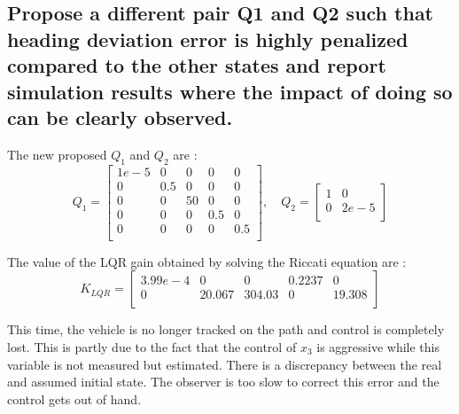 \subsection{Propose a different pair Q1 and Q2 such that heading deviation error is highly penalized compared to the other states and report simulation results where the impact of doing so can be clearly observed.}
The new proposed $Q_1$ and $Q_2$ are :
\begin{equation}
    Q_1 = 
    \left[ {\begin{array}{ccccc}
        1e-5 &0   &0   &0   &0     \\
        0    &0.5 &0   &0   &0     \\
        0    &0   &50  &0   &0     \\
        0    &0   &0   &0.5 &0     \\
        0    &0   &0   &0   &0.5   \\
    \end{array} } \right]    
    ,\quad
    Q_2 =
    \left[ {\begin{array}{cc}
        1 &0\\
        0 &2e-5\\
    \end{array} } \right]
\end{equation}

The value of the LQR gain obtained by solving the Riccati equation are :
\begin{equation}
    K_{LQR} = 
    \left[ {\begin{array}{ccccc}
         3.99e-4 &0       &0       &0.2237 &0      \\
         0         &20.067 &304.03 &0      &19.308 \\
    \end{array}}\right]
\end{equation}

This time, the vehicle is no longer tracked on the path and control is completely lost. This is partly due to the fact that the control of $x_3$ is aggressive while this variable is not measured but estimated. There is a discrepancy between the real and assumed initial state. The observer is too slow to correct this error and the control gets out of hand.

